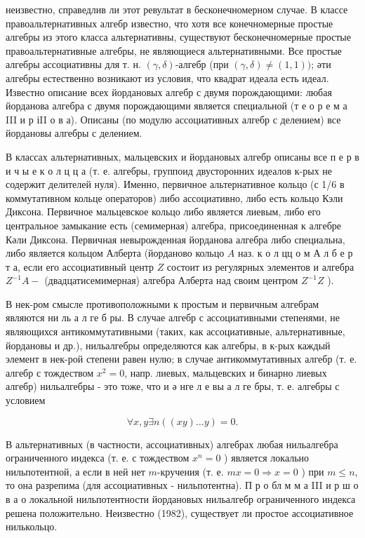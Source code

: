 \documentclass[10pt]{article}
\begin{document}
неизвестно, справедлив ли этот ревультат в бесконечномерном случае. В классе правоальтернативных алгебр известно, что хотя все конечномерные простые алгебры из этого класса альтернативны, существуют бесконечномерные простые правоальтернативные алгебры, не являющиеся альтернативными. Все простые алгебры ассоциативны для т. н. $(\gamma, \delta)$-алгебр (при $(\gamma, \delta) \neq(1,1))$; әти алгебры естественно возникают из условия, что квадрат идеала есть идеал. Известно описание всех йордановых алгебр с двумя порождающими: любая йорданова алгебра с двумя порождающими является специальной (т е о р е м а III и р іII о в а). Описаны (по модулю ассоциативных алгебр с делением) все йордановы алгебры с делением.



В классах альтернативных, мальцевских и йордановых алгебр описаны все п е р в и ч ы е к о л ц ц а (т. е. алгебры, группоид двусторонних идеалов к-рых не содержит делителей нуля). Именно, первичное альтернативное кольцо (с 1/6 в коммутативном кольце операторов) либо ассоциативно, либо есть кольцо Кэли Диксона. Первичное мальцевское кольцо либо является лиевым, либо его центральное замыкание есть (семимерная) алгебра, присоединенная к алгебре Кәли Диксона. Первичная невырожденная йорданова алгебра либо специальна, либо является кольцом Алберта (йорданово кольцо $A$ наз. к о л цц о м А л б е р т а, если его ассоциативный центр $Z$ состоит из регулярных элементов и алгебра $Z^{-1} A-$ (двадцатисемимерная) алгебра Алберта над своим центром $Z^{-1} Z$ ).



В нек-ром смысле противоположными к простым и первичным алгебрам являются ни ль а л ге б ры. В случае алгебр с ассоциативными степенями, не являющихся антикоммутативными (таких, как ассоциативные, альтернативные, йордановы и др.), нильалгебры определяются как алгебры, в к-рых каждый элемент в нек-рой степени равен нулю; в случае антикоммутативных алгебр (т. е. алгебр с тождеством $x^{2}=0$, напр. лиевых, мальцевских и бинарно лиевых алгебр) нильалгебры - это тоже, что и ә нге л е вы а л ге бры, т. е. алгебры с условием



\[

\forall x, y \exists n((x y) \ldots y)=0 .

\]



В альтернативных (в частности, ассоциативных) алгебрах любая нильалгебра ограниченного индекса (т. е. с тождеством $x^{n}=0$ ) является локально нильпотентной, а если в ней нет $m$-кручения (т. е. $m x=0 \Rightarrow x=0$ ) при $m \leqslant n$, то она разрепима (для ассоциативных - нильпотентна). П р о бл м м а III и р ш о в а о локальной нильпотентности йордановых нильалгебр ограниченного индекса решена положительно. Неизвестно (1982), существует ли простое ассоциативное нилькольцо.
\end{document}
